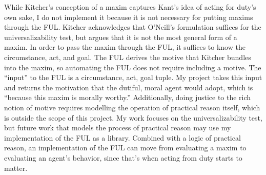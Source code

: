\begin{isabellebody}
\begin{isamarkuptext}
While Kitcher's conception of a maxim captures Kant's idea of acting for duty's own sake, I do not implement it 
because it is not necessary for putting maxims through the FUL. Kitcher acknowledges that 
O'Neill's formulation suffices for the universalizability test, but argues that it is not the most general form of a maxim.
In order to pass the maxim through the FUL, it suffices to know the circumstance, act, and goal. The FUL
derives the motive that Kitcher bundles into the maxim, so automating the FUL does not require 
including a motive. The ``input'' to the FUL is a circumstance, act, goal tuple. My project takes 
this input and returns the motivation that the dutiful, moral agent would adopt, which is ``because this
maxim is morally worthy.'' Additionally, doing
justice to the rich notion of motive requires modelling the operation of practical reason itself, 
which is outside the scope of this project. My work focuses on the universalizability test, but future work that 
models the process of practical reason may use my implementation of the FUL as a library. Combined 
with a logic of practical reason, an implementation of the FUL can move from evaluating a maxim to 
evaluating an agent's behavior, since that's when acting from duty starts to matter.


\end{isamarkuptext}
\end{isabellebody}
